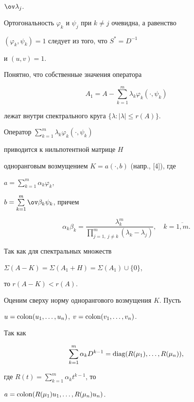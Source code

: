 $\ov\lambda_j$.


Ортогональность $\varphi_k$ и $\psi_j$ при $k\ne j$ очевидна, а равенство 


$(\varphi_k,\psi_k) = 1$ следует из того, что $S^* = D^{-1}$ 


и $(u,v) = 1$.





Понятно, что собственные значения оператора 


$$


A_1 = A - \sum_{k=1}^m \lambda_k \varphi_k (\cdot, \psi_k)


$$


лежат внутри спектрального круга $\{\lambda : |\lambda| \le r(A) \}$.


Оператор $\sum\limits_{k=1}^m\lambda_k \varphi_k (\cdot, \psi_k)$ 


приводится к нильпотентной матрице $H$


одноранговым возмущением  $K = a (\cdot, b)$ (напр., [4]), где


$a = \sum\limits_{k=1}^m \alpha_k \varphi_k$, 


$b = \sum\limits_{k=1}^m \ov\beta_k \psi_k$, причем


\begin{equation}\label{4}


\alpha_k \beta_k =\frac{\lambda_k^m}


{\prod\limits_{j=1,\ j\ne k}^m (\lambda_k - \lambda_j)},\quad k=\overline{1,m}.


\end{equation}


Так как для спектральных множеств


$\Sigma(A-K) = \Sigma(A_1 + H) = \Sigma(A_1)\cup \{0\}$,


то $r(A-K) < r(A)$.





Оценим сверху норму однорангового возмущения $K$. Пусть


$u=\operatorname{colon}(u_1,\dotsc,u_n)$, $v = \operatorname{colon} (v_1,\dotsc,v_n)$.


Так как


$$


\sum_{k=1}^m \alpha_k D^{k-1} = \diag (R(\mu_1),\ldots,R(\mu_n)),


$$


где $R(t) = \sum\limits_{k=1}^m \alpha_k t^{k-1}$, то


$a = \operatorname{colon}(R(\mu_1) u_1,\dotsc,R(\mu_n) u_n)$.


